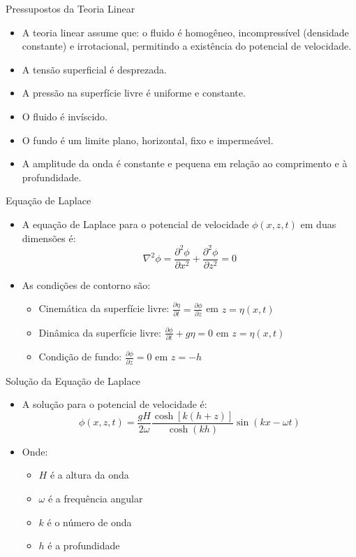 \documentclass[aspectratio=169,xcolor=table]{beamer}
\begin{document}
\begin{frame}{Pressupostos da Teoria Linear}
    \begin{itemize}
        \item A teoria linear assume que: o fluido é homogêneo, incompressível (densidade constante) e irrotacional, permitindo a existência do potencial de velocidade.
        \item A tensão superficial é desprezada.
        \item A pressão na superfície livre é uniforme e constante.
        \item O fluido é invíscido.
        \item O fundo é um limite plano, horizontal, fixo e impermeável.
        \item A amplitude da onda é constante e pequena em relação ao comprimento e à profundidade.
    \end{itemize}
\end{frame}

\begin{frame}{Equação de Laplace}
    \begin{itemize}
        \item A equação de Laplace para o potencial de velocidade $\phi(x,z,t)$ em duas dimensões é:
        \[\nabla^2\phi = \frac{\partial^2\phi}{\partial x^2} + \frac{\partial^2\phi}{\partial z^2} = 0\]
        \item As condições de contorno são:
        \begin{itemize}
            \item Cinemática da superfície livre: $\frac{\partial \eta}{\partial t} = \frac{\partial \phi}{\partial z}$ em $z = \eta(x,t)$
            \item Dinâmica da superfície livre: $\frac{\partial \phi}{\partial t} + g\eta = 0$ em $z = \eta(x,t)$
            \item Condição de fundo: $\frac{\partial \phi}{\partial z} = 0$ em $z = -h$
        \end{itemize}
    \end{itemize}
\end{frame}

\begin{frame}{Solução da Equação de Laplace}
    \begin{itemize}
        \item A solução para o potencial de velocidade é:
        \[\phi(x,z,t) = \frac{gH}{2\omega}\frac{\cosh[k(h+z)]}{\cosh(kh)}\sin(kx-\omega t)\]
        \item Onde:
        \begin{itemize}
            \item $H$ é a altura da onda
            \item $\omega$ é a frequência angular
            \item $k$ é o número de onda
            \item $h$ é a profundidade
        \end{itemize}
    \end{itemize}
\end{frame}
\end{document}
